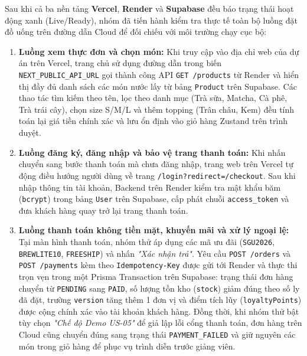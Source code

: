 Sau khi cả ba nền tảng \textbf{Vercel}, \textbf{Render} và \textbf{Supabase} đều báo trạng thái hoạt động xanh (Live/Ready), nhóm đã tiến hành kiểm tra thực tế toàn bộ luồng đặt đồ uống trên đường dẫn Cloud để đối chiếu với môi trường chạy cục bộ:

\begin{enumerate}
    \item \textbf{Luồng xem thực đơn và chọn món:} Khi truy cập vào địa chỉ web của dự án trên Vercel, trang chủ sử dụng đường dẫn trong biến \texttt{NEXT\_PUBLIC\_API\_URL} gọi thành công API \texttt{GET /products} từ Render và hiển thị đầy đủ danh sách các món nước lấy từ bảng \texttt{Product} trên Supabase. Các thao tác tìm kiếm theo tên, lọc theo danh mục (Trà sữa, Matcha, Cà phê, Trà trái cây), chọn size S/M/L và thêm topping (Trân châu, Kem) đều tính toán lại giá tiền chính xác và lưu ổn định vào giỏ hàng Zustand trên trình duyệt.
    \item \textbf{Luồng đăng ký, đăng nhập và bảo vệ trang thanh toán:} Khi nhấn chuyển sang bước thanh toán mà chưa đăng nhập, trang web trên Vercel tự động điều hướng người dùng về trang \texttt{/login?redirect=/checkout}. Sau khi nhập thông tin tài khoản, Backend trên Render kiểm tra mật khẩu băm (\texttt{bcrypt}) trong bảng \texttt{User} trên Supabase, cấp phát chuỗi \texttt{access\_token} và đưa khách hàng quay trở lại trang thanh toán.
    \item \textbf{Luồng thanh toán không tiền mặt, khuyến mãi và xử lý ngoại lệ:} Tại màn hình thanh toán, nhóm thử áp dụng các mã ưu đãi (\texttt{SGU2026}, \texttt{BREWLITE10}, \texttt{FREESHIP}) và nhấn \textit{"Xác nhận trả"}. Yêu cầu \texttt{POST /orders} và \texttt{POST /payments} kèm theo \texttt{Idempotency-Key} được gửi tới Render và thực thi trọn vẹn trong một Prisma Transaction trên Supabase: trạng thái đơn hàng chuyển từ \texttt{PENDING} sang \texttt{PAID}, số lượng tồn kho (\texttt{stock}) giảm đúng theo số ly đã đặt, trường \texttt{version} tăng thêm 1 đơn vị và điểm tích lũy (\texttt{loyaltyPoints}) được cộng chính xác vào tài khoản khách hàng. Đồng thời, khi nhóm thử bật tùy chọn \textit{"Chế độ Demo US-05"} để giả lập lỗi cổng thanh toán, đơn hàng trên Cloud cũng chuyển đúng sang trạng thái \texttt{PAYMENT\_FAILED} và giữ nguyên các món trong giỏ hàng để phục vụ trình diễn trước giảng viên.
\end{enumerate} 
